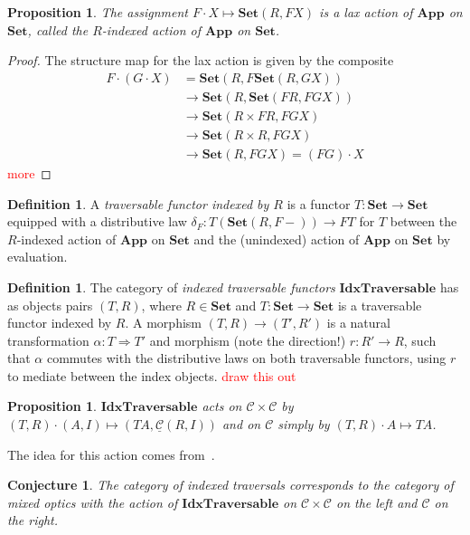 \documentclass[11pt,letterpaper]{article}
\theoremstyle{plain}
\newtheorem{proposition}[theorem]{Proposition}
\newtheorem{conjecture}[theorem]{Conjecture}
\theoremstyle{definition}
\newtheorem{definition}[theorem]{Definition}
\newcommand{\C}{\mathscr{C}}
\newcommand{\homC}{\underline{\C}}
\newcommand{\Set}{\mathbf{Set}}
\newcommand{\App}{\mathbf{App}}
\newcommand{\IdxTraversable}{\mathbf{IdxTraversable}}
\newcommand{\act}{\cdot}
\newcommand{\todo}[1]{\textcolor{red}{\small #1}}
\begin{document}
\begin{proposition}
The assignment $F \act X \mapsto \Set(R, FX)$ is a lax action of $\App$ on $\Set$, called the \emph{$R$-indexed action of $\App$ on $\Set$}.
\end{proposition}
\begin{proof}
The structure map for the lax action is given by the composite
\begin{align*}
F \act (G \act X) &= \Set(R, F\Set(R, GX)) \\
&\to \Set(R, \Set(FR, FGX)) \\
&\to \Set(R \times FR, FGX) \\
&\to \Set(R \times R, FGX) \\
&\to \Set(R, FGX) = (FG) \act X
\end{align*}
\todo{more}
\end{proof}

\begin{definition}
A \emph{traversable functor indexed by $R$} is a functor $T : \Set \to \Set$ equipped with a distributive law $\delta_F : T(\Set(R, F-)) \to FT$ for $T$ between the $R$-indexed action of $\App$ on $\Set$ and the (unindexed) action of $\App$ on $\Set$ by evaluation.
\end{definition}

\begin{definition}
The category of \emph{indexed traversable functors} $\IdxTraversable$ has as objects pairs $(T, R)$, where $R \in \Set$ and $T : \Set \to \Set$ is a traversable functor indexed by $R$. A morphism $(T, R) \to (T', R')$ is a natural transformation $\alpha : T \Rightarrow T'$ and morphism (note the direction!) $r : R' \to R$, such that $\alpha$ commutes with the distributive laws on both traversable functors, using $r$ to mediate between the index objects. \todo{draw this out}
\end{definition}

\begin{proposition}
$\IdxTraversable$ acts on $\C \times \C$ by $(T, R) \act (A, I) \mapsto (TA, \homC(R, I))$ and on $\C$ simply by $(T, R) \act A \mapsto TA$.
\end{proposition}

The idea for this action comes from~\cite{IndexedOpticsPost}.

\begin{conjecture}
The category of indexed traversals corresponds to the category of mixed optics with the action of $\IdxTraversable$ on $\C \times \C$ on the left and $\C$ on the right.
\end{conjecture}
\end{document}

